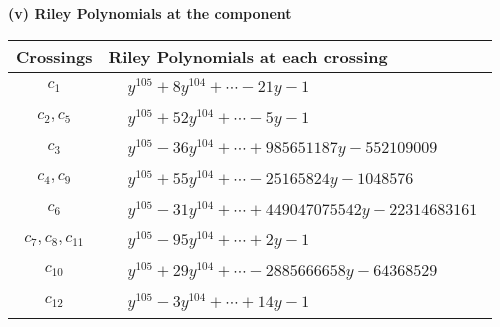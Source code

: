 \documentclass[1p]{elsarticle_modified}
\theoremstyle{definition}
\begin{document}
\newpage\renewcommand{\arraystretch}{1}
\flushleft \textbf{(v) Riley Polynomials at the component}\newline \\
\begin{tabular}{m{50pt}|m{274pt}}
Crossings & \hspace{64pt}Riley Polynomials at each crossing \\
\hline $$\begin{aligned}c_{1}\end{aligned}$$&$\begin{aligned}
&y^{105}+8 y^{104}+\cdots-21 y-1
\end{aligned}$\\
\hline $$\begin{aligned}c_{2},c_{5}\end{aligned}$$&$\begin{aligned}
&y^{105}+52 y^{104}+\cdots-5 y-1
\end{aligned}$\\
\hline $$\begin{aligned}c_{3}\end{aligned}$$&$\begin{aligned}
&y^{105}-36 y^{104}+\cdots+985651187 y-552109009
\end{aligned}$\\
\hline $$\begin{aligned}c_{4},c_{9}\end{aligned}$$&$\begin{aligned}
&y^{105}+55 y^{104}+\cdots-25165824 y-1048576
\end{aligned}$\\
\hline $$\begin{aligned}c_{6}\end{aligned}$$&$\begin{aligned}
&y^{105}-31 y^{104}+\cdots+449047075542 y-22314683161
\end{aligned}$\\
\hline $$\begin{aligned}c_{7},c_{8},c_{11}\end{aligned}$$&$\begin{aligned}
&y^{105}-95 y^{104}+\cdots+2 y-1
\end{aligned}$\\
\hline $$\begin{aligned}c_{10}\end{aligned}$$&$\begin{aligned}
&y^{105}+29 y^{104}+\cdots-2885666658 y-64368529
\end{aligned}$\\
\hline $$\begin{aligned}c_{12}\end{aligned}$$&$\begin{aligned}
&y^{105}-3 y^{104}+\cdots+14 y-1
\end{aligned}$\\
\hline
\end{tabular}\\~\\
\end{document}
